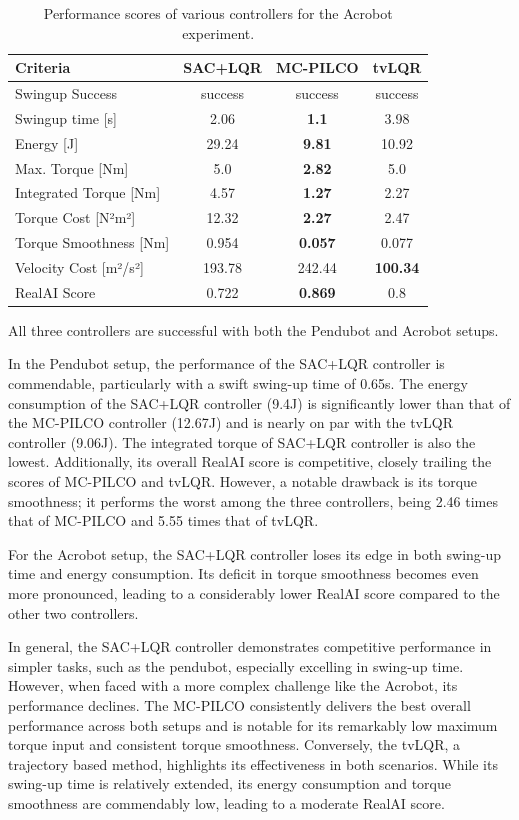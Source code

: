 \begin{table}[H]
  \centering
 \begin{tabular}{lccc}
 \hline
 Criteria & SAC+LQR & MC-PILCO & tvLQR \\
 \hline
 Swingup Success & success & success & success \\
 Swingup time [s] & 2.06 & \textbf{1.1} & 3.98 \\
 Energy [J] & 29.24 & \textbf{9.81} & 10.92 \\
 Max. Torque [Nm] & 5.0 & \textbf{2.82} & 5.0 \\
 Integrated Torque [Nm] & 4.57 & \textbf{1.27} & 2.27 \\
 Torque Cost [N²m²] & 12.32 & \textbf{2.27} & 2.47 \\
 Torque Smoothness [Nm] & 0.954 & \textbf{0.057} & 0.077 \\
 Velocity Cost [m²/s²] & 193.78 & 242.44 & \textbf{100.34} \\
 RealAI Score & 0.722 & \textbf{0.869} & 0.8 \\
 \hline
 \end{tabular}
 \caption{Performance scores of various controllers for the Acrobot experiment.}
 \label{tab:performance_acrobot}
\end{table}

All three controllers are successful with both the Pendubot and Acrobot setups.

In the Pendubot setup, the performance of the SAC+LQR controller is commendable, particularly with a swift swing-up time of 0.65s. The energy consumption of the SAC+LQR controller (9.4J) is significantly lower than that of the MC-PILCO controller (12.67J) and is nearly on par with the tvLQR controller (9.06J). The integrated torque of SAC+LQR controller is also the lowest. Additionally, its overall RealAI score is competitive, closely trailing the scores of MC-PILCO and tvLQR. However, a notable drawback is its torque smoothness; it performs the worst among the three controllers, being 2.46 times that of MC-PILCO and 5.55 times that of tvLQR.

For the Acrobot setup, the SAC+LQR controller loses its edge in both swing-up time and energy consumption. Its deficit in torque smoothness becomes even more pronounced, leading to a considerably lower RealAI score compared to the other two controllers.

In general, the SAC+LQR controller demonstrates competitive performance in simpler tasks, such as the pendubot, especially excelling in swing-up time. However, when faced with a more complex challenge like the Acrobot, its performance declines. The MC-PILCO consistently delivers the best overall performance across both setups and is notable for its remarkably low maximum torque input and consistent torque smoothness. Conversely, the tvLQR, a trajectory based method, highlights its effectiveness in both scenarios. While its swing-up time is relatively extended, its energy consumption and torque smoothness are commendably low, leading to a moderate RealAI score.


